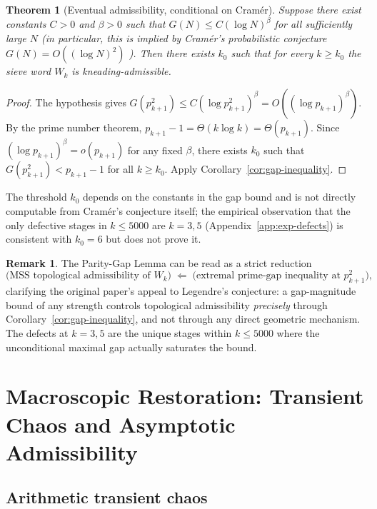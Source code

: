 \documentclass[11pt,a4paper]{article}
\newtheorem{theorem}{Theorem}
\theoremstyle{definition}
\newtheorem{remark}{Remark}
\begin{document}
\begin{theorem}[Eventual admissibility, conditional on Cram\'er]
\label{thm:eventual}
Suppose there exist constants $C > 0$ and $\beta > 0$ such that
$G(N) \leq C (\log N)^{\beta}$ for all sufficiently large $N$
(in particular, this is implied by Cram\'er's probabilistic conjecture
$G(N) = O((\log N)^2)$ \cite{cramer1936order}). Then there exists
$k_0$ such that for every $k \geq k_0$ the sieve word $W_k$ is
kneading-admissible.
\end{theorem}

\begin{proof}
The hypothesis gives
$G(p_{k+1}^2) \leq C (\log p_{k+1}^2)^\beta = O((\log p_{k+1})^\beta)$.
By the prime number theorem,
$p_{k+1} - 1 = \Theta(k \log k) = \Theta(p_{k+1})$. Since
$(\log p_{k+1})^\beta = o(p_{k+1})$ for any fixed $\beta$, there exists
$k_0$ such that $G(p_{k+1}^2) < p_{k+1} - 1$ for all $k \geq k_0$.
Apply Corollary~\ref{cor:gap-inequality}.
\end{proof}

The threshold $k_0$ depends on the constants in the gap bound and is
not directly computable from Cram\'er's conjecture itself; the
empirical observation that the only defective stages in $k \leq 5000$
are $k = 3, 5$ (Appendix~\ref{app:exp-defects}) is consistent with
$k_0 = 6$ but does not prove it.

\begin{remark}
The Parity-Gap Lemma can be read as a strict reduction
\[
    \text{(MSS topological admissibility of } W_k\text{)}
    \;\Longleftarrow\;
    \text{(extremal prime-gap inequality at } p_{k+1}^2\text{)},
\]
clarifying the original paper's appeal to Legendre's conjecture: a
gap-magnitude bound of any strength controls topological admissibility
\emph{precisely} through Corollary~\ref{cor:gap-inequality}, and not
through any direct geometric mechanism. The defects at $k = 3, 5$ are
the unique stages within $k \leq 5000$ where the unconditional maximal
gap actually saturates the bound.
\end{remark}

\section{Macroscopic Restoration: Transient Chaos and Asymptotic Admissibility}
\label{sec:macro}

\subsection{Arithmetic transient chaos}
\end{document}
